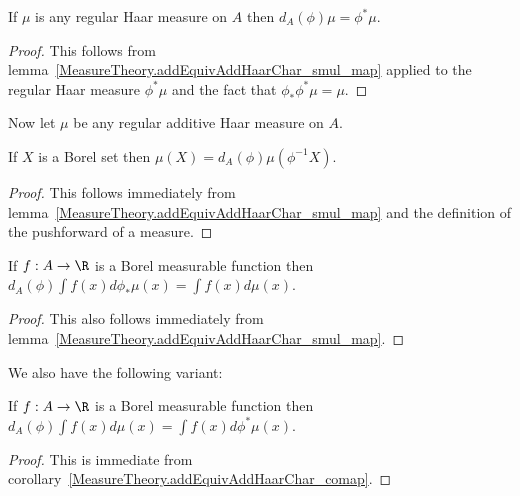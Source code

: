 \begin{corollary}
  \label{MeasureTheory.addEquivAddHaarChar_comap}
  \leanok
  If $\mu$ is any regular Haar measure on $A$ then
  $d_A(\phi)\mu = \phi^*\mu.$
\end{corollary}
\begin{proof}
  \leanok
  This follows from lemma~\ref{MeasureTheory.addEquivAddHaarChar_smul_map}
  applied to the regular Haar measure $\phi^*\mu$ and the fact that $\phi_*\phi^*\mu=\mu$.
\end{proof}

Now let $\mu$ be any regular additive Haar measure on $A$.

\begin{lemma}
  \label{MeasureTheory.addEquivAddHaarChar_smul_preimage}
  \leanok
  If $X$ is a Borel set then $\mu(X)=d_A(\phi)\mu(\phi^{-1}X)$.
\end{lemma}
\begin{proof}
  \leanok
  This follows immediately from lemma~\ref{MeasureTheory.addEquivAddHaarChar_smul_map}
  and the definition of the pushforward of a measure.
\end{proof}

\begin{lemma}
  \label{MeasureTheory.addEquivAddHaarChar_smul_integral_map}
  \leanok
  If $f:A\to\R$ is a Borel measurable function then
  $d_A(\phi)\int f(x)d\phi_*\mu(x)=\int f(x)d\mu(x)$.
\end{lemma}
\begin{proof}
  \leanok
  This also follows immediately from lemma~\ref{MeasureTheory.addEquivAddHaarChar_smul_map}.
\end{proof}

We also have the following variant:

\begin{lemma}
  \label{MeasureTheory.addEquivAddHaarChar_smul_integral_comap}
  \leanok
  If $f:A\to\R$ is a Borel measurable function then
  $d_A(\phi)\int f(x)d\mu(x)=\int f(x)d\phi^*\mu(x)$.
\end{lemma}
\begin{proof}
  \leanok
  This is immediate from corollary~\ref{MeasureTheory.addEquivAddHaarChar_comap}.
\end{proof}

